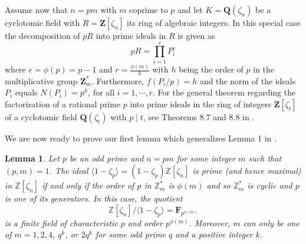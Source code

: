 \documentclass[a4paper,12pt,reqno]{amsart}
\newtheorem{lemma}[theorem]{Lemma}
\def\Z{\mathbf{Z}}
\def\Q{\mathbf{Q}}
\def\F{\mathbf{F}}
\begin{document}
Assume now that $n=pm $ with $m$ coprime to $p$ and let $K= \Q(\zeta_n)$  be a cyclotomic field with  $R= \Z[\zeta_n]$ its ring of algebraic integers. In this special case  the decomposition of $pR$ into prime ideals in $R$ is given as 
\[
pR=  \prod_{i=1}^r P_i^e
\]
where  $e= \phi(p)=p-1$ and  $r= \frac{\phi(m)}{h}$ with  $h$ being the order of $p$ in the multiplicative group $\Z_m^*$. Furthermore, $f(P_i/p) = h$ and the norm of the ideals $P_i$ equals $N(P_i)=p^h$,  for all $i=1, \cdots, r$. 
For the general theorem regarding the factorization of a rational  prime $p$ into prime ideals in the ring of integers $\Z[\zeta_t]$ of  a cyclotomic field $\Q(\zeta_t)$ with $p \mid t$,  see Theorems 8.7 and 8.8 in \cite{Mann}.

We are now ready to prove our first lemma which generalizes  Lemma 1 in \cite{Frenkel}. 
\begin{lemma}\label{Lem:MaximalIdeal}
Let $p$ be an odd prime and $n = pm$ for some integer $m$ such that $(p, m) = 1$. The ideal $\langle 1 - \zeta_p \rangle = (1 - \zeta_p)\mathbb{Z}[\zeta_n]$ is prime (and hence maximal) in $\mathbb{Z}[\zeta_n]$ if and only if the order of $p$ in $\mathbb{Z}_m^*$ is $\phi(m)$ and so $\mathbb{Z}_m^*$ is cyclic and  $p$ is one of its  generators. In this case, the quotient 
\[
\mathbb{Z}[\zeta_{n}]/\langle 1 - \zeta_p \rangle = \F_{p^{\phi(m)}}
\] 
is a finite field of characteristic $p$ and order $p^{\phi(m)}$. Moreover, $m$ can only be one of  $m=1,2,4$, $q^k$, or $2q^k$ for some odd prime $q$ and a positive integer  $k$.
\end{lemma}
\end{document}
